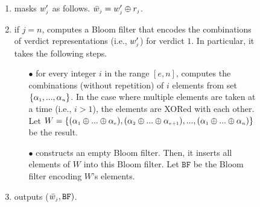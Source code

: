 \begin{figure}[!htbp]
\begin{center}
\begin{tcolorbox}[enhanced,width=5.5in,
    drop fuzzy shadow southwest,
    colframe=black,colback=white]
{\begin{enumerate}
%
%
\begin{equation*}
   w'_{\st j}= 
\begin{cases}
   0,              & \text{if } w_{\st j}=0\\
   \alpha_{\st j}=\mathtt{PRF}(\bar k_{\st 0}, 2||o||j||\text{ID}) ,& \text{if } w_{\st j}=1\\

\end{cases}
\end{equation*}
%
\item masks  $w'_{\scriptscriptstyle j}$ as follows. %
%
$\bar w_{\scriptscriptstyle j}= w'_{\scriptscriptstyle j}\oplus r_{\scriptscriptstyle j}$.
%
\item if $j=n$, computes a Bloom filter that encodes the combinations of verdict representations (i.e., $w'_{\scriptscriptstyle j}$)  for verdict $1$. In particular, it takes the following steps. 
\begin{itemize}
%
\item[$\bullet$] for every integer $i$ in the range $[e,n]$, computes the combinations (without repetition) of $i$ elements from set $\{\alpha_{\scriptscriptstyle 1},..., \alpha_{\scriptscriptstyle n}\}$. In the case where  multiple elements are taken at a time (i.e., $i>1$), the elements are XORed with each other. Let $W=\{(\alpha_{\scriptscriptstyle 1}\oplus... \oplus \alpha_{\scriptscriptstyle e}), (\alpha_{\scriptscriptstyle 2}\oplus ... \oplus \alpha_{\scriptscriptstyle e+1}), ..., (\alpha_{\scriptscriptstyle 1}\oplus... \oplus \alpha_{\scriptscriptstyle n})\}$ be the result.  
%
\item[$\bullet$] constructs an empty Bloom filter. Then, it inserts all elements of $W$ into this Bloom filter. Let $\mathtt{BF}$ be the Bloom filter encoding $W$'s elements. 

\end{itemize}
%

%
\item outputs ($\bar{ w}_{\scriptscriptstyle j}, \mathtt{BF})$.






\end{enumerate}}
\end{tcolorbox}
\end{center}
\end{figure}
